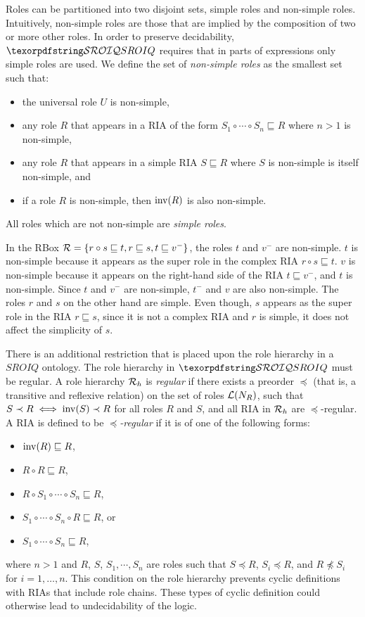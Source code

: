 Roles can be partitioned into two disjoint sets, simple roles and non-simple roles. Intuitively, non-simple roles are those that are implied by the composition of two or more other roles. In order to preserve decidability, $\SROIQ$ requires that in parts of expressions only simple roles are used. We define the set of \emph{non-simple roles} as the smallest set such that:
\begin{itemize}
  \item the universal role $U$ is non-simple,
  \item any role $R$ that appears in a RIA of the form $S_1 \circ \cdots \circ S_n \sqsubseteq R$ where $n > 1$ is non-simple,
  \item any role $R$ that appears in a simple RIA $S \sqsubseteq R$ where $S$ is non-simple is itself non-simple, and
  \item if a role $R$ is non-simple, then $\operatorname{inv}(R)$ is also non-simple.
\end{itemize}
All roles which are not non-simple are \emph{simple roles}.

\begin{example}
  In the RBox $\mathcal{R} = \{ r \circ s \sqsubseteq t, r \sqsubseteq s, t \sqsubseteq v^- \}$, the roles $t$ and $v^-$ are non-simple. $t$ is non-simple because it appears as the super role in the complex RIA $r \circ s \sqsubseteq t$. $v$ is non-simple because it appears on the right-hand side of the RIA $t \sqsubseteq v^-$, and $t$ is non-simple. Since $t$ and $v^-$ are non-simple, $t^-$ and $v$ are also non-simple. The roles $r$ and $s$ on the other hand are simple. Even though, $s$ appears as the super role in the RIA $r \sqsubseteq s$, since it is not a complex RIA and $r$ is simple, it does not affect the simplicity of $s$.
\end{example}

There is an additional restriction that is placed upon the role hierarchy in a $SROIQ$ ontology. The role hierarchy in $\SROIQ$ must be regular. A role hierarchy $\mathcal{R}_h$ is \emph{regular} if there exists a preorder $\preceq$ (that is, a transitive and reflexive relation) on the set of roles $\mathcal{L}(N_R)$, such that $S \prec R \iff \operatorname{inv}(S) \prec R$ for all roles $R$ and $S$, and all RIA in $\mathcal{R}_h$ are $\preceq$-regular. A RIA is defined to be $\preceq$\emph{-regular} if it is of one of the following forms:
\begin{itemize}
  \item $\operatorname{inv}(R) \sqsubseteq R$,
  \item $R \circ R \sqsubseteq R$,
  \item $R \circ S_1 \circ \cdots \circ S_n \sqsubseteq R$,
  \item $S_1 \circ \cdots \circ S_n \circ R \sqsubseteq R$, or
  \item $S_1 \circ \cdots \circ S_n \sqsubseteq R$,
\end{itemize}
where $n > 1$ and $R$, $S$, $S_1, \cdots, S_n$ are roles such that $S \preceq R$, $S_i \preceq R$, and $R \not\preceq S_i$ for $i = 1, \dots, n$. This condition on the role hierarchy prevents cyclic definitions with RIAs that include role chains. These types of cyclic definition could otherwise lead to undecidability of the logic.

